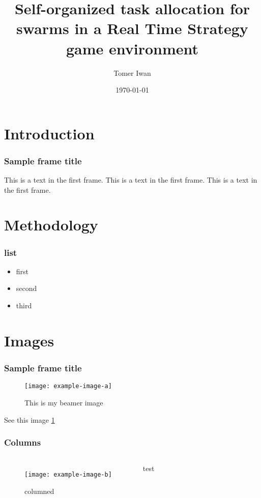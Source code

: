 \documentclass{beamer}
\title{Self-organized task allocation for swarms in a Real Time Strategy game environment}
\author{Tomer Iwan}
\institute{Vrije Universiteit Amsterdam}
\date{\today}
\begin{document}
\frame{\titlepage}
\section{Introduction}
\begin{frame}
\frametitle{Sample frame title}
This is a text in the first frame. This is a text in the first frame. This is a text in the first frame.
\end{frame}

\section{Methodology}
\begin{frame}
    \frametitle{list}
    \begin{itemize}
        \item first \pause
        \item second \pause
        \item third
    \end{itemize}
\end{frame}

\section{Images}
\begin{frame}
\frametitle{Sample frame title}
\begin{figure}
    \centering
    \texttt{[image: example-image-a]}
    \caption{This is my beamer image}
    \label{fig:example}
\end{figure}
See this image \ref{fig:example}
\end{frame}

\begin{frame}
    \frametitle{Columns}
    \begin{columns}
        \begin{figure}
            \centering
            \texttt{[image: example-image-b]}
            \caption{columned}
            \label{fig:columned}
        \end{figure}
        test
    \end{columns}
\end{frame}
\end{document}

